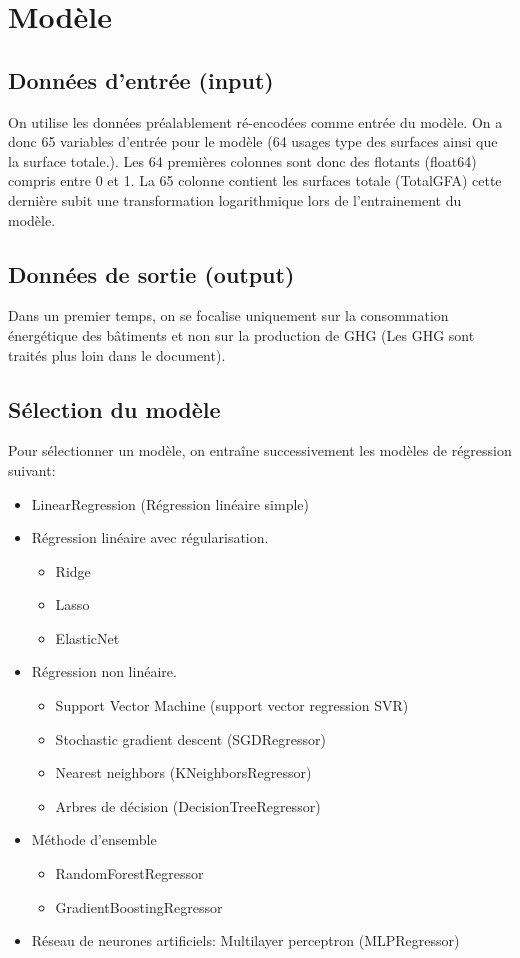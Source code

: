 \section{Modèle}


\subsection{Données d'entrée (input)}

On utilise les données préalablement ré-encodées comme entrée du modèle.
On a donc 65 variables d'entrée pour le modèle (64 usages type des surfaces ainsi
que la surface totale.).
Les 64 premières colonnes sont donc des flotants (float64) compris entre 0 et 1.
La 65 colonne contient les surfaces totale (TotalGFA) cette dernière
subit une transformation logarithmique lors de l'entrainement du modèle.

\subsection{Données de sortie (output)}

Dans un premier temps, on se focalise uniquement sur la consommation énergétique
des bâtiments et non sur la production de GHG (Les GHG sont traités plus loin
dans le document).

\subsection{Sélection du modèle}

Pour sélectionner un modèle, on entraîne successivement les modèles de
régression suivant:
\begin{itemize}
  \item LinearRegression (Régression linéaire simple)
  \item Régression linéaire avec régularisation.
  \begin{itemize}
    \item Ridge \cite{Marquardt1975}
    \item Lasso \cite{tibshirani96regression}
    \item ElasticNet
  \end{itemize}
  \item Régression non linéaire.
  \begin{itemize}
    \item Support Vector Machine (support vector regression SVR)
    \item Stochastic gradient descent (SGDRegressor)
    \item Nearest neighbors (KNeighborsRegressor)
    \item Arbres de décision (DecisionTreeRegressor)
  \end{itemize}
  \item Méthode d'ensemble
  \begin{itemize}
    \item RandomForestRegressor
    \item GradientBoostingRegressor
  \end{itemize}
  \item Réseau de neurones artificiels: Multilayer perceptron (MLPRegressor)
\end{itemize}

